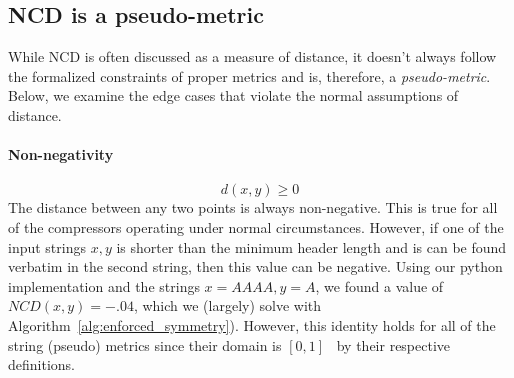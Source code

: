 \documentclass[conference]{IEEEtran}
\newcommand{\cm}[1]{\textit{{\color{blue}#1}}}
\begin{document}



\subsection{NCD is a pseudo-metric}
\label{pseudometric}
While NCD is often discussed as a measure of distance, it doesn't always follow the formalized constraints of proper metrics and is, therefore, a \textit{pseudo-metric}. Below, we examine the edge cases that violate the normal assumptions of distance.

\paragraph{Non-negativity} 
\[
d(x, y) \geq 0
\]
The distance between any two points is always non-negative. This is true for all of the compressors operating under normal circumstances. However, if one of the input strings $x,y$ is shorter than the minimum header length and is can be found verbatim in the second string, then this value can be negative. Using our python implementation and the strings $x=AAAA, y=A$, we found a value of $NCD(x,y) = -.04$, which we (largely) solve with Algorithm~\ref{alg:enforced_symmetry}).
However, this identity holds for all of the string (pseudo) metrics since their domain is $[0,1]$~\cite{metrics,levenshtein} by their respective definitions. 
\end{document}
